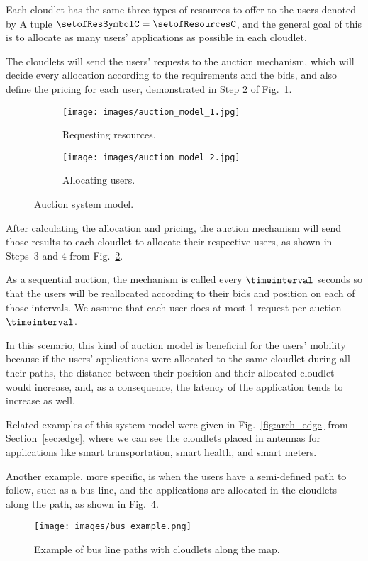 \documentclass[English]{ic-tese-v3}
\begin{document}
Each cloudlet has the same three types of resources to offer to the users denoted by A tuple $\setofResSymbolC = \setofResourcesC$, and the general goal of this is to allocate as many users' applications as possible in each cloudlet. 

The cloudlets will send the users' requests to the auction mechanism, which will decide every allocation according to the requirements and the bids, and also define the pricing for each user, demonstrated in Step $2$ of Fig.~\ref{fig:auction_model_1}.
\begin{figure}[H]
    \centering
    \begin{subfigure}{.45\textwidth}
        \centering
        \texttt{[image: images/auction\_model\_1.jpg]}
        \caption{Requesting resources.}
        \label{fig:auction_model_1}
    \end{subfigure}
    \begin{subfigure}{.45\textwidth}
        \centering
        \texttt{[image: images/auction\_model\_2.jpg]}
        \caption{Allocating users.}
        \label{fig:auction_model_2}
    \end{subfigure}
    \caption{Auction system model.}
    \label{fig:auction_model}
\end{figure}
After calculating the allocation and pricing, the auction mechanism will send those results to each cloudlet to allocate their respective users, as shown in Steps~$3$ and $4$ from Fig.~\ref{fig:auction_model_2}.

As a sequential auction, the mechanism is called every $\timeinterval$ seconds so that the users will be reallocated according to their bids and position on each of those intervals. We assume that each user does at most 1 request per auction $\timeinterval$.

In this scenario, this kind of auction model is beneficial for the users' mobility because if the users' applications were allocated to the same cloudlet during all their paths, the distance between their position and their allocated cloudlet would increase, and, as a consequence, the latency of the application tends to increase as well.

Related examples of this system model were given in Fig.~\ref{fig:arch_edge} from Section~\ref{sec:edge}, where we can see the cloudlets placed in antennas for applications like smart transportation, smart health, and smart meters. 

Another example, more specific, is when the users have a semi-defined path to follow, such as a bus line, and the applications are allocated in the cloudlets along the path, as shown in Fig.~\ref{fig:bus_example}.
\begin{figure}[H]
    \centering
    \texttt{[image: images/bus\_example.png]}
    \caption{Example of bus line paths with cloudlets along the map.}
    \label{fig:bus_example}
\end{figure}
\end{document}
